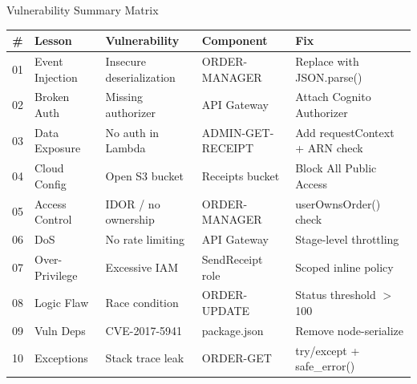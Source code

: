 \documentclass[aspectratio=169,10pt]{beamer}
\begin{document}
\begin{frame}{Vulnerability Summary Matrix}
\centering
\footnotesize
\begin{tabularx}{\textwidth}{c >{\raggedright}p{2.3cm} >{\raggedright}p{3cm} >{\raggedright}p{2.8cm} >{\raggedright\arraybackslash}p{3.5cm}}
\toprule
\textbf{\#} & \textbf{Lesson} & \textbf{Vulnerability} & \textbf{Component} & \textbf{Fix} \\
\midrule
01 & Event Injection & Insecure deserialization & ORDER-MANAGER & Replace with JSON.parse() \\
02 & Broken Auth & Missing authorizer & API Gateway & Attach Cognito Authorizer \\
03 & Data Exposure & No auth in Lambda & ADMIN-GET-RECEIPT & Add requestContext + ARN check \\
04 & Cloud Config & Open S3 bucket & Receipts bucket & Block All Public Access \\
05 & Access Control & IDOR / no ownership & ORDER-MANAGER & userOwnsOrder() check \\
06 & DoS & No rate limiting & API Gateway & Stage-level throttling \\
07 & Over-Privilege & Excessive IAM & SendReceipt role & Scoped inline policy \\
08 & Logic Flaw & Race condition & ORDER-UPDATE & Status threshold $>$100 \\
09 & Vuln Deps & CVE-2017-5941 & package.json & Remove node-serialize \\
10 & Exceptions & Stack trace leak & ORDER-GET & try/except + safe\_error() \\
\bottomrule
\end{tabularx}
\end{frame}

{
\begin{frame}
\end{frame}
}
\end{document}
